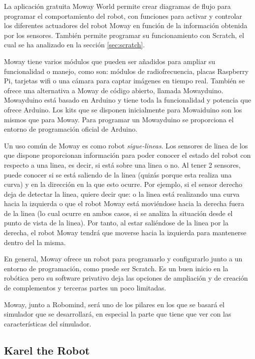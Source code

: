 {{La aplicación gratuita Moway World permite crear diagramas de flujo para programar el comportamiento del robot, con funciones para activar y controlar los diferentes actuadores del robot Moway en función de la información obtenida por los sensores. También permite programar su funcionamiento con Scratch, el cual se ha analizado en la sección \ref{sec:scratch}. 

Moway tiene varios módulos que pueden ser añadidos para ampliar su funcionalidad o manejo, como son: módulos de radiofrecuencia, placas Raspberry Pi, tarjetas wifi o una cámara para captar imágenes en tiempo real. También se ofrece una alternativa a Moway de código abierto, llamada Mowayduino. Mowayduino está basado en Arduino y tiene toda la funcionalidad y potencia que ofrece Arduino. Los kits que se disponen inicialmente para Mowaiduino son los mismos que para Moway. Para programar un Mowayduino se proporciona el entorno de programación oficial de Arduino.


Un uso común de Moway es como robot \emph{sigue-lineas}. Los sensores de linea de los que dispone proporcionan información para poder conocer el estado del robot con respecto a una linea, es decir, si está sobre una linea o no. Al tener 2 sensores, puede conocer si se está saliendo de la linea (quizás porque esta realiza una curva) y en la dirección en la que esto ocurre. Por ejemplo, si el sensor derecho deja de detectar la linea, quiere decir que: o la linea está realizando una curva hacia la izquierda o que el robot Moway está moviéndose hacia la derecha fuera de la linea (lo cual ocurre en ambos casos, si se analiza la situación desde el punto de vista de la linea). Por tanto, al estar saliéndose de la linea por la derecha, el robot Moway tendrá que moverse hacia la izquierda para mantenerse dentro del la misma. 


En general, Moway ofrece un robot para programarlo y configurarlo junto a un entorno de programación, como puede ser Scratch. Es un buen inicio en la robótica pero su software privativo deja las opciones de ampliación y de creación de complementos y terceras partes un poco limitadas.

Moway, junto a Robomind, será uno de los pilares en los que se basará el simulador que se desarrollará, en especial la parte que tiene que ver con las características del simulador.



\subsection{Karel the Robot}
\label{sec:karel-the-robot}


}}
